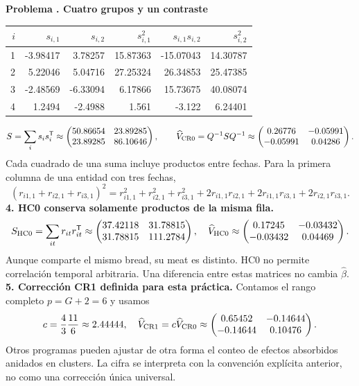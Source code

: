 \documentclass[11pt,a4paper]{article}
\newcommand{\T}{^{\mathsf T}}
\theoremstyle{definition}
\newcounter{problema}
\newenvironment{resuelto}[1]{\refstepcounter{problema}\par\medskip\Needspace{6\baselineskip}\textbf{Problema \theproblema. #1}\par}{\par\medskip}
\begin{document}
\begin{resuelto}{Cuatro grupos y un contraste}
\begin{center}\small
\begin{tabular}{rrrrrr}
\toprule
$i$&$s_{i,1}$&$s_{i,2}$&$s_{i,1}^2$&$s_{i,1}s_{i,2}$&$s_{i,2}^2$\\
\midrule
1&-3.98417&3.78257&15.87363&-15.07043&14.30787\\
2&5.22046&5.04716&27.25324&26.34853&25.47385\\
3&-2.48569&-6.33094&6.17866&15.73675&40.08074\\
4&1.2494&-2.4988&1.561&-3.122&6.24401\\
\bottomrule
\end{tabular}
\end{center}
\[
S=\sum_i s_is_i\T\approx\begin{pmatrix}
50.86654&23.89285\\23.89285&86.10646
\end{pmatrix},\qquad \widehat V_{\rm CR0}=Q^{-1}SQ^{-1}\approx\begin{pmatrix}
0.26776&-0.05991\\-0.05991&0.04286
\end{pmatrix}.
\]
Cada cuadrado de una suma incluye productos entre fechas. Para la primera columna de una entidad con tres fechas,
\[
(r_{i1,1}+r_{i2,1}+r_{i3,1})^2
=r_{i1,1}^2+r_{i2,1}^2+r_{i3,1}^2
+2r_{i1,1}r_{i2,1}+2r_{i1,1}r_{i3,1}+2r_{i2,1}r_{i3,1}.
\]
\textbf{4. HC0 conserva solamente productos de la misma fila.}
\[
S_{\rm HC0}=\sum_{it}r_{it}r_{it}\T\approx\begin{pmatrix}
37.42118&31.78815\\31.78815&111.2784
\end{pmatrix},\quad
\widehat V_{\rm HC0}\approx\begin{pmatrix}
0.17245&-0.03432\\-0.03432&0.04469
\end{pmatrix}.
\]
Aunque comparte el mismo bread, su meat es distinto. HC0 no permite correlación temporal arbitraria. Una diferencia entre estas matrices no cambia $\widehat\beta$.
\textbf{5. Corrección CR1 definida para esta práctica.} Contamos el rango completo $p=G+2=6$ y usamos
\[
c=\frac{4}{3}\frac{11}{6}\approx2.44444,\quad \widehat V_{\rm CR1}=c\widehat V_{\rm CR0}\approx\begin{pmatrix}
0.65452&-0.14644\\-0.14644&0.10476
\end{pmatrix}.
\]
Otros programas pueden ajustar de otra forma el conteo de efectos absorbidos anidados en clusters. La cifra se interpreta con la convención explícita anterior, no como una corrección única universal.

\end{resuelto}
\end{document}
